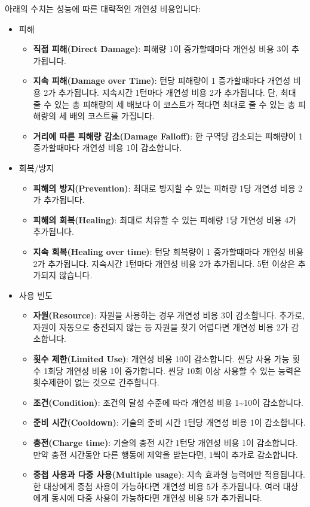 \documentclass{report}
\begin{document}
	아래의 수치는 성능에 따른 대략적인 개연성 비용입니다:
	\begin{itemize}
		\item 피해
		\begin{itemize}
			\item \textbf{직접 피해(Direct Damage)}: 피해량 1이 증가할때마다 개연성 비용 3이 추가됩니다.
			\item \textbf{지속 피해(Damage over Time)}: 턴당 피해량이 1 증가할때마다 개연성 비용 2가 추가됩니다. 지속시간 1턴마다 개연성 비용 2가 추가됩니다. 단, 최대 줄 수 있는 총 피해량의 세 배보다 이 코스트가 적다면 최대로 줄 수 있는 총 피해량의 세 배의 코스트를 가집니다.
			\item \textbf{거리에 따른 피해량 감소(Damage Falloff)}: 한 구역당 감소되는 피해량이 1 증가할때마다 개연성 비용 1이 감소합니다.
		\end{itemize}
		
		\item 회복/방지
		\begin{itemize}
			\item \textbf{피해의 방지(Prevention)}: 최대로 방지할 수 있는 피해량 1당 개연성 비용 2가 추가됩니다.
			\item \textbf{피해의 회복(Healing)}: 최대로 치유할 수 있는 피해량 1당 개연성 비용 4가 추가됩니다.
			\item \textbf{지속 회복(Healing over time)}: 턴당 회복량이 1 증가할때마다 개연성 비용 2가 추가됩니다. 지속시간 1턴마다 개연성 비용 2가 추가됩니다. 5턴 이상은 추가되지 않습니다.
		\end{itemize}
		
		\item 사용 빈도
		\begin{itemize}
			\item \textbf{자원(Resource)}: 자원을 사용하는 경우 개연성 비용 3이 감소합니다. 추가로, 자원이 자동으로 충전되지 않는 등 자원을 찾기 어렵다면 개연성 비용 2가 감소합니다.
			\item \textbf{횟수 제한(Limited Use)}: 개연성 비용 10이 감소합니다. 씬당 사용 가능 횟수 1회당 개연성 비용 1이 증가합니다. 씬당 10회 이상 사용할 수 있는 능력은 횟수제한이 없는 것으로 간주합니다.
			\item \textbf{조건(Condition)}: 조건의 달성 수준에 따라 개연성 비용 1\textasciitilde10이 감소합니다.
			\item \textbf{준비 시간(Cooldown)}: 기술의 준비 시간 1턴당 개연성 비용 1이 감소합니다.
			\item \textbf{충전(Charge time)}: 기술의 충전 시간 1턴당 개연성 비용 1이 감소합니다. 만약 충전 시간동안 다른 행동에 제약을 받는다면, 1씩이 추가로 감소합니다.
			\item \textbf{중첩 사용과 다중 사용(Multiple usage)}: 지속 효과형 능력에만 적용됩니다. 한 대상에게 중첩 사용이 가능하다면 개연성 비용 5가 추가됩니다. 여러 대상에게 동시에 다중 사용이 가능하다면 개연성 비용 5가 추가됩니다.
		\end{itemize}
		

\end{itemize}
\end{document}

